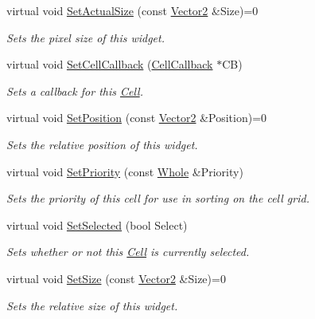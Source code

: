 \begin{DoxyCompactItemize}
virtual void \hyperlink{classphys_1_1UI_1_1Cell_a3666c40546d1e6a225421d3bfd0288f9}{SetActualSize} (const \hyperlink{classphys_1_1Vector2}{Vector2} \&Size)=0
\begin{DoxyCompactList}\small\item\em Sets the pixel size of this widget. \item\end{DoxyCompactList}\item 
virtual void \hyperlink{classphys_1_1UI_1_1Cell_a141d5642d251d102a3c87220b5c8607e}{SetCellCallback} (\hyperlink{classphys_1_1UI_1_1CellCallback}{CellCallback} $\ast$CB)
\begin{DoxyCompactList}\small\item\em Sets a callback for this \hyperlink{classphys_1_1UI_1_1Cell}{Cell}. \item\end{DoxyCompactList}\item 
virtual void \hyperlink{classphys_1_1UI_1_1Cell_af43b353b0033d3605dad04e925363f2b}{SetPosition} (const \hyperlink{classphys_1_1Vector2}{Vector2} \&Position)=0
\begin{DoxyCompactList}\small\item\em Sets the relative position of this widget. \item\end{DoxyCompactList}\item 
virtual void \hyperlink{classphys_1_1UI_1_1Cell_a886778f945fc31bdc118d101d67f9f80}{SetPriority} (const \hyperlink{namespacephys_a460f6bc24c8dd347b05e0366ae34f34a}{Whole} \&Priority)
\begin{DoxyCompactList}\small\item\em Sets the priority of this cell for use in sorting on the cell grid. \item\end{DoxyCompactList}\item 
virtual void \hyperlink{classphys_1_1UI_1_1Cell_abb516a7a4fa2abe00ff037987beea745}{SetSelected} (bool Select)
\begin{DoxyCompactList}\small\item\em Sets whether or not this \hyperlink{classphys_1_1UI_1_1Cell}{Cell} is currently selected. \item\end{DoxyCompactList}\item 
virtual void \hyperlink{classphys_1_1UI_1_1Cell_a59075a5ae35c2080876fcc78a97e5b31}{SetSize} (const \hyperlink{classphys_1_1Vector2}{Vector2} \&Size)=0
\begin{DoxyCompactList}\small\item\em Sets the relative size of this widget. \item\end{DoxyCompactList}\item 

\end{DoxyCompactItemize}
